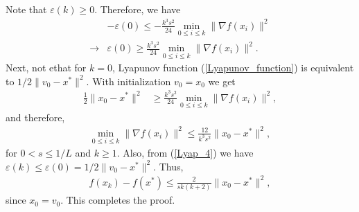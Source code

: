 \documentclass{article}
\theoremstyle{plain}
\theoremstyle{definition}
\theoremstyle{remark}
\begin{document}
Note that $\varepsilon(k)\geq 0$. Therefore, we have
\begin{align}\label{Lyap_5}
   & -\varepsilon(0) \leq -\frac{k^3s^2}{24}\min_{0\leq i\leq k}\|\nabla f(x_i)\|^2\nonumber\\
    \rightarrow & \varepsilon(0)\geq \frac{k^3s^2}{24}\min_{0\leq i\leq k}\|\nabla f(x_i)\|^2.
\end{align}
Next, not ethat for $k=0$, Lyapunov function (\ref{Lyapunov_function}) is equivalent to $1/2\|v_0-x^*\|^2$. With initialization $v_0=x_0$ we get
\begin{align}\label{Lyap_6}
    \frac{1}{2}\|x_0-x^*\|^2&\geq \frac{k^3s^2}{24}\min_{0\leq i\leq k}\|\nabla f(x_i)\|^2,
\end{align}
and therefore,
\begin{align}\label{Lyap_7}
    \min_{0\leq i\leq k}\|\nabla f(x_i)\|^2 \leq \frac{12}{k^3s^2}\|x_0-x^*\|^2,
\end{align}
for $0< s\leq 1/L$ and $k\geq 1$. 
Also, from (\ref{Lyap_4}) we have $\varepsilon(k)\leq \varepsilon(0) = 1/2\|v_0-x^*\|^2$. Thus,
\begin{align}\label{Lyap_8}
    f(x_k)-f(x^*)\leq \frac{2}{sk(k+2)}\|x_0-x^*\|^2,
\end{align}
since $x_0=v_0$. This completes the proof.
\end{document}

